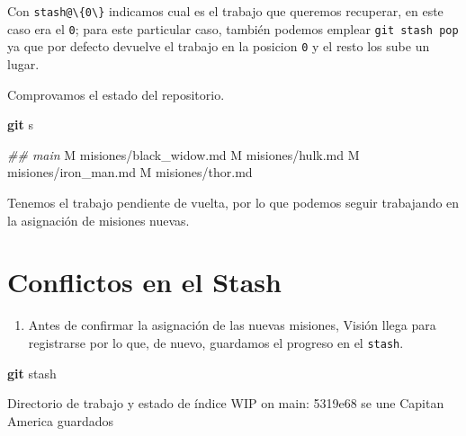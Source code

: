 \documentclass[
]{book}
\newenvironment{Shaded}{\begin{snugshade}}{\end{snugshade}}
\newcommand{\CommentTok}[1]{\textcolor[rgb]{0.56,0.35,0.01}{\textit{#1}}}
\newcommand{\ExtensionTok}[1]{#1}
\newcommand{\FunctionTok}[1]{\textcolor[rgb]{0.13,0.29,0.53}{\textbf{#1}}}
\newcommand{\NormalTok}[1]{#1}
\providecommand{\tightlist}{%
  \setlength{\itemsep}{0pt}\setlength{\parskip}{0pt}}
\begin{document}
Con \texttt{stash@\textbackslash{}\{0\textbackslash{}\}} indicamos cual es el trabajo que queremos recuperar, en este caso era el \texttt{0}; para este particular caso, también podemos emplear \texttt{git\ stash\ pop} ya que por defecto devuelve el trabajo en la posicion \texttt{0} y el resto los sube un lugar.

Comprovamos el estado del repositorio.

\begin{Shaded}
\begin{Highlighting}[]
\FunctionTok{git}\NormalTok{ s}
\end{Highlighting}
\end{Shaded}

\begin{Shaded}
\begin{Highlighting}[]
\CommentTok{\#\# main}
 \ExtensionTok{M}\NormalTok{ misiones/black\_widow.md}
 \ExtensionTok{M}\NormalTok{ misiones/hulk.md}
 \ExtensionTok{M}\NormalTok{ misiones/iron\_man.md}
 \ExtensionTok{M}\NormalTok{ misiones/thor.md}
\end{Highlighting}
\end{Shaded}

Tenemos el trabajo pendiente de vuelta, por lo que podemos seguir trabajando en la asignación de misiones nuevas.

\section{Conflictos en el Stash}\label{conflictos-en-el-stash}

\begin{enumerate}
\def\labelenumi{\arabic{enumi}.}
\tightlist
\item
  Antes de confirmar la asignación de las nuevas misiones, Visión llega para registrarse por lo que, de nuevo, guardamos el progreso en el \texttt{stash}.
\end{enumerate}

\begin{Shaded}
\begin{Highlighting}[]
\FunctionTok{git}\NormalTok{ stash}
\end{Highlighting}
\end{Shaded}

\begin{Shaded}
\begin{Highlighting}[]
\ExtensionTok{Directorio}\NormalTok{ de trabajo y estado de índice WIP on main: 5319e68 se une Capitan America guardados}
\end{Highlighting}
\end{Shaded}
\end{document}
